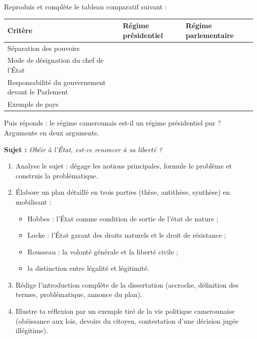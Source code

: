 \documentclass[11pt]{article}
\newcounter{popsec}
\newcounter{popsub}
\newcommand{\courssub}[1]{%
  \stepcounter{popsub}%
  \par\vspace{9pt}\noindent{\popxbold\fontsize{11.5}{13}\selectfont\color{popink}{\color{poporange}\thepopsec.\thepopsub}\hspace{6pt}#1}\par\nopagebreak\vspace{4pt}
}
\begin{document}
\begin{exercice}
Reproduis et complète le tableau comparatif suivant :
\begin{center}
\begin{tabularx}{\linewidth}{|l|X|X|}
\hline
\rowcolor{popblueL} \textbf{Critère} & \textbf{Régime présidentiel} & \textbf{Régime parlementaire} \\
\hline Séparation des pouvoirs & & \\
\hline Mode de désignation du chef de l'État & & \\
\hline Responsabilité du gouvernement devant le Parlement & & \\
\hline Exemple de pays & & \\
\hline
\end{tabularx}
\end{center}
Puis réponds : le régime camerounais est-il un régime présidentiel pur ? Argumente en deux arguments.
\end{exercice}

\courssub{Je me prépare au Bac}

\begin{exercice}
\textbf{Sujet :} \emph{Obéir à l'État, est-ce renoncer à sa liberté ?}
\begin{enumerate}
\item Analyse le sujet : dégage les notions principales, formule le problème et construis la problématique.
\item Élabore un plan détaillé en trois parties (thèse, antithèse, synthèse) en mobilisant :
\begin{itemize}
\item Hobbes : l'État comme condition de sortie de l'état de nature ;
\item Locke : l'État garant des droits naturels et le droit de résistance ;
\item Rousseau : la volonté générale et la liberté civile ;
\item la distinction entre légalité et légitimité.
\end{itemize}
\item Rédige l'introduction complète de la dissertation (accroche, définition des termes, problématique, annonce du plan).
\item Illustre ta réflexion par un exemple tiré de la vie politique camerounaise (obéissance aux lois, devoirs du citoyen, contestation d'une décision jugée illégitime).
\end{enumerate}
\end{exercice}
\end{document}
